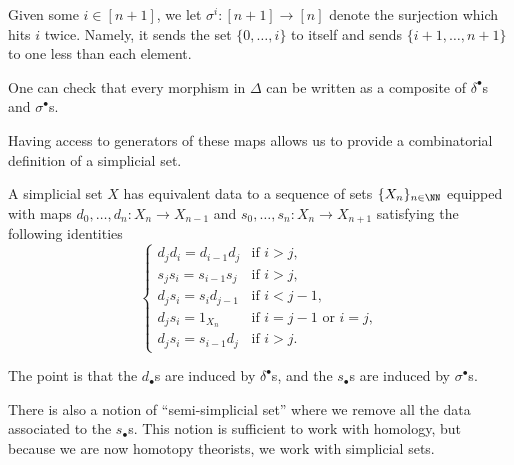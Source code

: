 \documentclass[../notes.tex]{subfiles}
\begin{document}
\begin{notation}
	Given some $i\in[n+1]$, we let $\sigma^i\colon[n+1]\to[n]$ denote the surjection which hits $i$ twice. Namely, it sends the set $\{0,\ldots,i\}$ to itself and sends $\{i+1,\ldots,n+1\}$ to one less than each element.
\end{notation}
\begin{remark}
	One can check that every morphism in $\Delta$ can be written as a composite of $\delta^\bullet$s and $\sigma^\bullet$s.
\end{remark}
Having access to generators of these maps allows us to provide a combinatorial definition of a simplicial set.
\begin{proposition}
	A simplicial set $X$ has equivalent data to a sequence of sets $\{X_n\}_{n\in\NN}$ equipped with maps $d_0,\ldots,d_n\colon X_n\to X_{n-1}$ and $s_0,\ldots,s_n\colon X_n\to X_{n+1}$ satisfying the following identities
	\[\begin{cases}
		d_jd_i=d_{i-1}d_j & \text{if }i>j, \\
		s_js_i=s_{i-1}s_j & \text{if }i>j, \\
		d_js_i=s_id_{j-1} & \text{if }i<j-1, \\
		d_js_i=1_{X_n} & \text{if }i=j-1\text{ or }i=j, \\
		d_js_i=s_{i-1}d_j & \text{if }i>j.
	\end{cases}\]
\end{proposition}
The point is that the $d_\bullet$s are induced by $\delta^\bullet$s, and the $s_\bullet$s are induced by $\sigma^\bullet$s.
\begin{remark}
	There is also a notion of ``semi-simplicial set'' where we remove all the data associated to the $s_\bullet$s. This notion is sufficient to work with homology, but because we are now homotopy theorists, we work with simplicial sets.
\end{remark}
\end{document}
